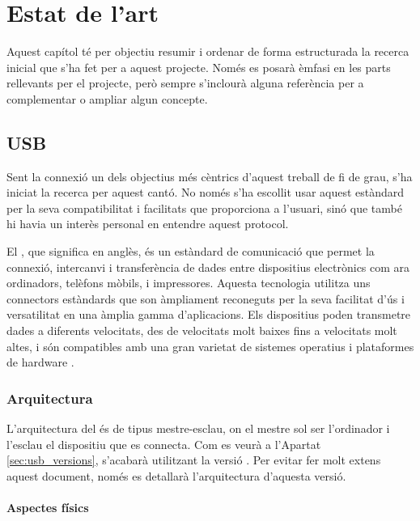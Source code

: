 \chapter{Estat de l'art}
\label{cap:estat-de-l-art}

Aquest capítol té per objectiu resumir i ordenar de forma estructurada la
recerca inicial que s'ha fet per a aquest projecte. Només es posarà èmfasi en
les parts rellevants per el projecte, però sempre s'inclourà alguna referència
per a complementar o ampliar algun concepte.

\section{USB}

Sent la connexió  un dels objectius més cèntrics d'aquest treball de
fi de grau, s'ha iniciat la recerca per aquest cantó. No només s'ha escollit
usar aquest estàndard per la seva compatibilitat
i facilitats que proporciona a l'usuari, sinó que també hi havia un interès
personal en entendre aquest protocol.

El , que significa  en anglès, és un
estàndard de comunicació que permet la connexió, intercanvi i transferència de
dades entre dispositius electrònics com ara ordinadors, telèfons mòbils, i
impressores. Aquesta tecnologia utilitza uns connectors estàndards que son
àmpliament reconeguts per la seva facilitat d'ús i versatilitat en una àmplia
gamma d'aplicacions. Els dispositius  poden transmetre dades a
diferents velocitats, des de velocitats molt baixes fins a velocitats molt
altes, i són compatibles amb una gran varietat de sistemes operatius i
plataformes de hardware \cite{Axelson2015USB}.

\subsection{Arquitectura}

L'arquitectura del  és de tipus mestre-esclau, on el mestre sol ser
l'ordinador i l'esclau el dispositiu que es connecta. Com es veurà a l'Apartat
\ref{sec:usb_versions}, s'acabarà utilitzant la versió . Per
evitar fer molt extens aquest document, només es detallarà l'arquitectura
d'aquesta versió.

\subsubsection*{Aspectes físics}
\label{subsub:usb_physic}

